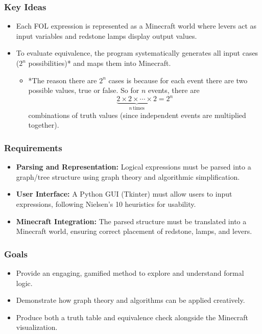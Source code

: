 \documentclass[11pt]{diazessay} %
\begin{document}
\subsubsection*{Key Ideas}
\begin{itemize}
    \item Each FOL expression is represented as a Minecraft world where levers act as input variables and redstone lamps display output values.  
    \item To evaluate equivalence, the program systematically generates all input cases ($2^n$ possibilities)* and maps them into Minecraft.
    \begin{itemize}
        \item *The reason there are $2^n$ cases is because for each event there are two possible values, true or false. So for $n$ events, there are \[
        \underbrace{2 \times 2 \times \cdots \times 2}_{n\,\mathrm{times}} = 2^n
		\]
	 combinations of truth values (since independent events are multiplied together).
	\end{itemize}
\end{itemize}

\subsubsection*{Requirements}
\begin{itemize}
    \item \textbf{Parsing and Representation:} Logical expressions must be parsed into a graph/tree structure using graph theory and algorithmic simplification.  
    \item \textbf{User Interface:} A Python GUI (Tkinter) must allow users to input expressions, following Nielsen’s 10 heuristics for usability.  
    \item \textbf{Minecraft Integration:} The parsed structure must be translated into a Minecraft world, ensuring correct placement of redstone, lamps, and levers.  
\end{itemize}

\subsubsection*{Goals}
\begin{itemize}
    \item Provide an engaging, gamified method to explore and understand formal logic.  
    \item Demonstrate how graph theory and algorithms can be applied creatively.  
    \item Produce both a truth table and equivalence check alongside the Minecraft visualization.  
\end{itemize}
\end{document}
